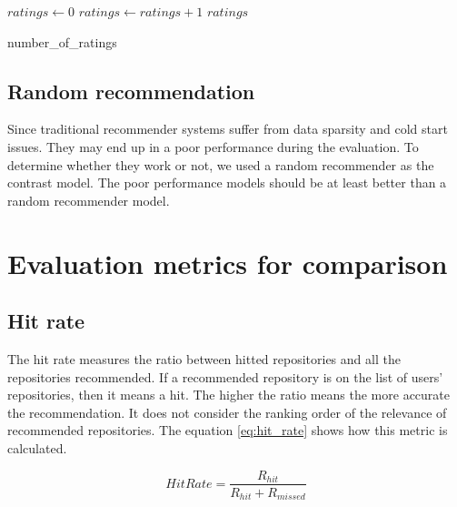 \documentclass[11pt,twoside]{report}
\begin{document}
\begin{algorithm}[H]
    \DontPrintSemicolon
    

    $ratings \leftarrow 0$ \newline
    {
        {
            $ratings \leftarrow ratings + 1$
        }
    }
    \Return $ratings$
    
    \caption{number\_of\_ratings}
    \label{alg:ratings}
\end{algorithm}


\subsection{Random recommendation}
Since traditional recommender systems suffer from data sparsity and cold start issues. They may end up in a poor performance during the evaluation. To determine whether they work or not, we used a random recommender as the contrast model. The poor performance models should be at least better than a random recommender model.

\section{Evaluation metrics for comparison}
\subsection{Hit rate}
The hit rate measures the ratio between hitted repositories and all the repositories recommended. If a recommended repository is on the list of users' repositories, then it means a hit. The higher the ratio means the more accurate the recommendation. It does not consider the ranking order of the relevance of recommended repositories. The equation \ref{eq:hit_rate} shows how this metric is calculated.

\begin{equation}
    HitRate=\frac{R_{hit}}{R_{hit}+R_{missed}}
    \label{eq:hit_rate}
\end{equation}
\end{document}

